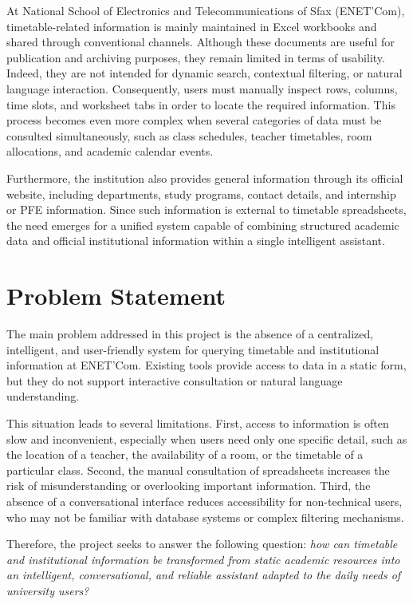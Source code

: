 At National School of Electronics and Telecommunications of Sfax (ENET'Com), timetable-related information is mainly maintained in Excel workbooks and shared through conventional channels. Although these documents are useful for publication and archiving purposes, they remain limited in terms of usability. Indeed, they are not intended for dynamic search, contextual filtering, or natural language interaction. Consequently, users must manually inspect rows, columns, time slots, and worksheet tabs in order to locate the required information. This process becomes even more complex when several categories of data must be consulted simultaneously, such as class schedules, teacher timetables, room allocations, and academic calendar events.

Furthermore, the institution also provides general information through its official website, including departments, study programs, contact details, and internship or PFE information. Since such information is external to timetable spreadsheets, the need emerges for a unified system capable of combining structured academic data and official institutional information within a single intelligent assistant.

\section{Problem Statement}
The main problem addressed in this project is the absence of a centralized, intelligent, and user-friendly system for querying timetable and institutional information at ENET'Com. Existing tools provide access to data in a static form, but they do not support interactive consultation or natural language understanding.

This situation leads to several limitations. First, access to information is often slow and inconvenient, especially when users need only one specific detail, such as the location of a teacher, the availability of a room, or the timetable of a particular class. Second, the manual consultation of spreadsheets increases the risk of misunderstanding or overlooking important information. Third, the absence of a conversational interface reduces accessibility for non-technical users, who may not be familiar with database systems or complex filtering mechanisms.

Therefore, the project seeks to answer the following question: \textit{how can timetable and institutional information be transformed from static academic resources into an intelligent, conversational, and reliable assistant adapted to the daily needs of university users?}

